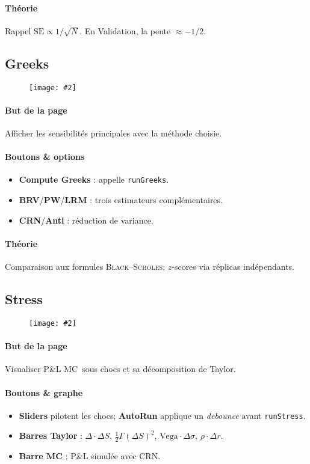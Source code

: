 \documentclass[11pt,a4paper]{article}
\newcommand{\code}[1]{\texttt{#1}}
\newcommand{\imgfull}[2][\textwidth]{\begin{figure}[H]\centering\texttt{[image: \#2]}\end{figure}}
\newcommand{\bs}{\textsc{Black--Scholes}}
\newcommand{\mc}{\textsc{MC}}
\begin{document}
\paragraph{Théorie}
Rappel \(\mathrm{SE}\propto 1/\sqrt{N}\). En Validation, la pente \(\approx-1/2\).

\subsection{Greeks}
\imgfull{greeks.png}
\paragraph{But de la page} Afficher les sensibilités principales avec la méthode choisie.
\paragraph{Boutons \& options}
\begin{itemize}[leftmargin=*]
  \item \textbf{Compute Greeks} : appelle \code{runGreeks}.
  \item \textbf{BRV}/\textbf{PW}/\textbf{LRM} : trois estimateurs complémentaires.
  \item \textbf{CRN}/\textbf{Anti} : réduction de variance.
\end{itemize}
\paragraph{Théorie}
Comparaison aux formules \bs; \(z\)-scores via réplicas indépendants.

\subsection{Stress}
\imgfull{stress.png}
\paragraph{But de la page} Visualiser P\&L \mc\ sous chocs et sa décomposition de Taylor.
\paragraph{Boutons \& graphe}
\begin{itemize}[leftmargin=*]
  \item \textbf{Sliders} pilotent les chocs; \textbf{AutoRun} applique un \emph{debounce} avant \code{runStress}.
  \item \textbf{Barres Taylor} : \(\Delta\cdot\Delta S\), \(\frac12\Gamma(\Delta S)^2\), \(\text{Vega}\cdot\Delta\sigma\), \(\rho\cdot\Delta r\).
  \item \textbf{Barre MC} : P\&L simulée avec CRN.
\end{itemize}
\end{document}
